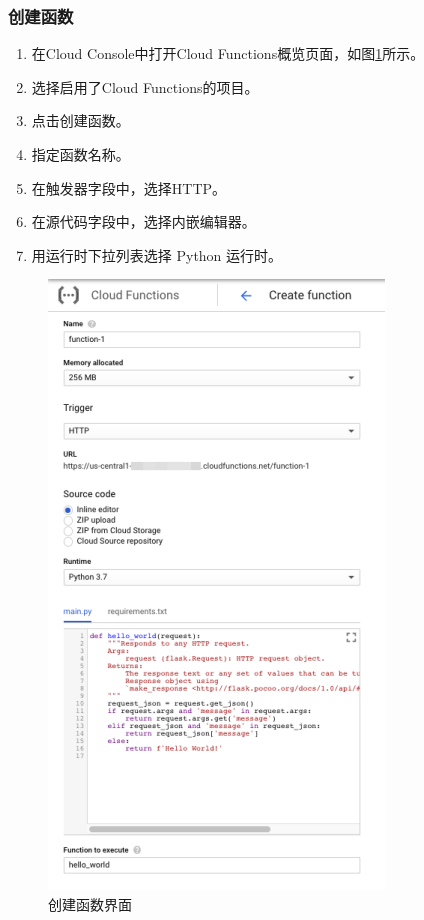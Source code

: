 \begin{multicols}{2}
	\subsubsection{创建函数} 
	\begin{enumerate}
		\item 在Cloud Console中打开Cloud Functions概览页面，如图\ref{fig15}所示。
		\item 选择启用了Cloud Functions的项目。
		\item 点击创建函数。
		\item 指定函数名称。
		\item 在触发器字段中，选择HTTP。
		\item 在源代码字段中，选择内嵌编辑器。
		\item 用运行时下拉列表选择 Python 运行时。
	\end{enumerate}
	\begin{figure}[H]
		\centering
		\includegraphics[width=\linewidth]{figs/15.png}
		\caption{创建函数界面}
		\label{fig15}	
	\end{figure}
\end{multicols}

